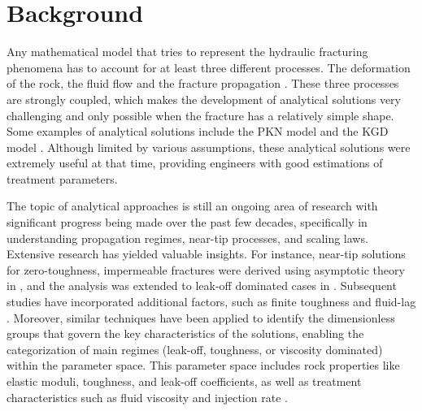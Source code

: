 \section{Background}







    Any mathematical model that tries to represent the hydraulic fracturing phenomena has to account for at least three different processes. The deformation of the rock, the fluid flow and the fracture propagation \cite{adachi2007computer}. These three processes are strongly coupled, which makes the development of analytical solutions very challenging and only possible when the fracture has a relatively simple shape. Some examples of analytical solutions include the PKN model \cite{perkins1961widths, sneddon1946opening, nordgren1972propagation} and the KGD model \cite{zheltov19553, geertsma1969rapid}. Although limited by various assumptions, these analytical solutions were extremely useful at that time, providing engineers with good estimations of treatment parameters.


    The topic of analytical approaches is still an ongoing area of research with significant progress being made over the past few decades, specifically in understanding propagation regimes, near-tip processes, and scaling laws. Extensive research has yielded valuable insights. For instance, near-tip solutions for zero-toughness, impermeable fractures were derived using asymptotic theory in \cite{desroches1994crack}, and the analysis was extended to leak-off dominated cases in \cite{lenoach1995crack}. Subsequent studies have incorporated additional factors, such as finite toughness and fluid-lag \cite{detournay2002asymptotic, detournay2003near, garagash2000tip}. Moreover, similar techniques have been applied to identify the dimensionless groups that govern the key characteristics of the solutions, enabling the categorization of main regimes (leak-off, toughness, or viscosity dominated) within the parameter space. This parameter space includes rock properties like elastic moduli, toughness, and leak-off coefficients, as well as treatment characteristics such as fluid viscosity and injection rate \cite{detournay2004propagation, adachi2002self, carbonell1999comparison, savitski2002propagation, garagash2005plane}.

